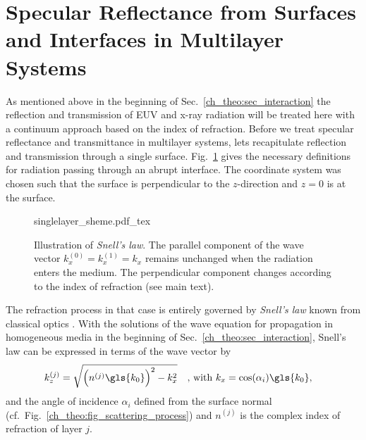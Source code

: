 \section{Specular Reflectance from Surfaces and Interfaces in Multilayer Systems}
As mentioned above in the beginning of Sec.~\ref{ch_theo:sec_interaction} the reflection and transmission of EUV and x-ray radiation will be treated here with a continuum approach based on the index of refraction. Before we treat specular reflectance and transmittance in multilayer systems, lets recapitulate reflection and transmission through a single surface. Fig.~\ref{ch_theo:fig_singlelayer_scheme} gives the necessary definitions for radiation passing through an abrupt interface. The coordinate system was chosen such that the surface is perpendicular to the $z$-direction and $z=0$ is at the surface.
\begin{figure}[htb]
    \def\svgwidth{0.57\textwidth}
    {singlelayer_sheme.pdf_tex}
    \caption{Illustration of \emph{Snell's law}. The parallel component of the wave vector $k_x^{(0)} = k_x^{(1)} = k_x$ remains unchanged when the radiation enters the medium. The perpendicular component changes according to the index of refraction (see main text).}
    \label{ch_theo:fig_singlelayer_scheme}
\end{figure}
The refraction process in that case is entirely governed by \emph{Snell's law} known from classical optics \cite{born_principles_1965}. With the solutions of the wave equation for propagation in homogeneous media in the beginning of Sec.~\ref{ch_theo:sec_interaction}, Snell's law can be expressed in terms of the wave vector by
\begin{align}
k_z^{(j)} &= \sqrt{\Big(n^{(j)} \gls{k_0}\Big)^2 - k_x^2} \quad \text{, with } k_x = \cos(\alpha_i) \gls{k_0} \text{,} \label{ch_theo:eqn_snells_law}
\end{align}
and the angle of incidence $\alpha_i$ defined from the surface normal (cf.~Fig.~\ref{ch_theo:fig_scattering_process}) and $n^{(j)}$ is the complex index of refraction of layer $j$.

